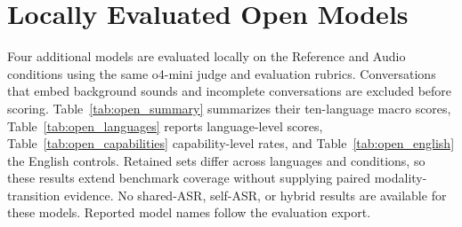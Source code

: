 

\section{Locally Evaluated Open Models}

\label{app:open_models}



Four additional models are evaluated locally on the Reference and Audio conditions using the same o4-mini judge and evaluation rubrics. Conversations that embed background sounds and incomplete conversations are excluded before scoring. Table~\ref{tab:open_summary} summarizes their ten-language macro scores, Table~\ref{tab:open_languages} reports language-level scores, Table~\ref{tab:open_capabilities} capability-level rates, and Table~\ref{tab:open_english} the English controls. Retained sets differ across languages and conditions, so these results extend benchmark coverage without supplying paired modality-transition evidence. No shared-ASR, self-ASR, or hybrid results are available for these models. Reported model names follow the evaluation export.


